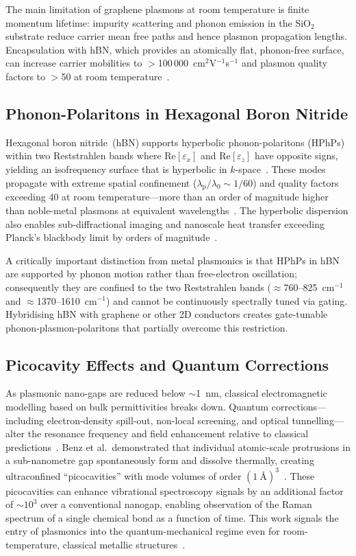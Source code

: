 \documentclass[twocolumn,10pt]{article}
\begin{document}
The main limitation of graphene plasmons at room temperature is finite
momentum lifetime: impurity scattering and phonon emission in the
SiO$_2$ substrate reduce carrier mean free paths and hence plasmon
propagation lengths.  Encapsulation with hBN, which provides an
atomically flat, phonon-free surface, can increase carrier
mobilities to $>$100\,000~cm$^2$V$^{-1}$s$^{-1}$ and plasmon
quality factors to $>$50 at room
temperature~\cite{grigorenko2012graphene}.

\subsection{Phonon-Polaritons in Hexagonal Boron Nitride}

Hexagonal boron nitride~(hBN) supports hyperbolic phonon-polaritons
(HPhPs) within two Reststrahlen bands where $\mathrm{Re}[\varepsilon_x]$
and $\mathrm{Re}[\varepsilon_z]$ have opposite signs, yielding an
isofrequency surface that is hyperbolic in $k$-space~\cite{caldwell2014sub}.
These modes propagate with extreme spatial confinement
($\lambda_\mathrm{p}/\lambda_0 \sim 1/60$) and quality factors
exceeding 40 at room temperature---more than an order of magnitude
higher than noble-metal plasmons at equivalent
wavelengths~\cite{caldwell2014sub}.  The hyperbolic dispersion
also enables sub-diffractional imaging and nanoscale heat transfer
exceeding Planck's blackbody limit by orders of
magnitude~\cite{caldwell2014sub}.

A critically important distinction from metal plasmonics is that HPhPs
in hBN are supported by phonon motion rather than free-electron
oscillation; consequently they are confined to the two Reststrahlen
bands ($\approx$760--825~cm$^{-1}$ and $\approx$1370--1610~cm$^{-1}$)
and cannot be continuously spectrally tuned via gating.  Hybridising
hBN with graphene or other 2D conductors creates gate-tunable
phonon-plasmon-polaritons that partially overcome this restriction.

\subsection{Picocavity Effects and Quantum Corrections}

As plasmonic nano-gaps are reduced below $\sim$1~nm, classical
electromagnetic modelling based on bulk permittivities breaks down.
Quantum corrections---including electron-density spill-out, non-local
screening, and optical tunnelling---alter the resonance frequency and
field enhancement relative to classical
predictions~\cite{benz2016single}.  Benz et al.\ demonstrated that
individual atomic-scale protrusions in a sub-nanometre gap
spontaneously form and dissolve thermally, creating ultraconfined
``picocavities'' with mode volumes of order
$(1~\text{\AA})^3$~\cite{benz2016single}.  These picocavities can
enhance vibrational spectroscopy signals by an additional factor of
$\sim$$10^3$ over a conventional nanogap, enabling observation of the
Raman spectrum of a single chemical bond as a function of time.
This work signals the entry of plasmonics into the quantum-mechanical
regime even for room-temperature, classical metallic
structures~\cite{benz2016single}.
\end{document}
